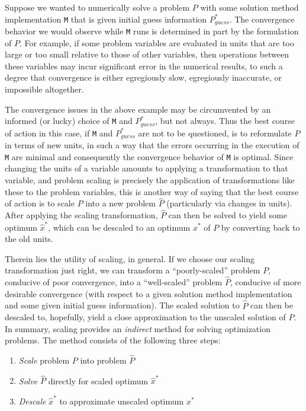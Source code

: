 \documentclass{article}
\begin{document}
\noindent
Suppose we wanted to numerically solve a problem $P$ with some solution method implementation \texttt{M} that is given initial guess information $P_{guess}^*$. The convergence behavior we would observe while \texttt{M} runs is determined in part by the formulation of $P$. For example, if some problem variables are evaluated in units that are too large or too small relative to those of other variables, then operations between these variables may incur significant error in the numerical results, to such a degree that convergence is either egregiously slow, egregiously inaccurate, or impossible altogether. 

The convergence issues in the above example may be circumvented by an informed (or lucky) choice of \texttt{M} and $P_{guess}^*$, but not always. Thus the best course of action in this case, if \texttt{M} and $P_{guess}^*$ are not to be questioned, is to reformulate $P$ in terms of new units, in such a way that the errors occurring in the execution of \texttt{M} are minimal and consequently the convergence behavior of \texttt{M} is optimal. Since changing the units of a variable amounts to applying a transformation to that variable, and problem scaling is precisely the application of transformations like these to the problem variables, this is another way of saying that the best course of action is to scale $P$ into a new problem $\hat{P}$ (particularly via changes in units). After applying the scaling transformation, $\hat{P}$ can then be solved to yield some optimum $\hat{x}^*$, which can be descaled to an optimum $x^*$ of $P$ by converting back to the old units.

Therein lies the utility of scaling, in general. If we choose our scaling transformation just right, we can transform a ``poorly-scaled'' problem $P$, conducive of poor convergence, into a ``well-scaled'' problem $\hat{P}$, conducive of more desirable convergence (with respect to a given solution method implementation and some given initial guess information). The scaled solution to $\hat{P}$ can then be descaled to, hopefully, yield a close approximation to the unscaled solution of $P$.
\\

\noindent
In summary, scaling provides an \textit{indirect} method for solving optimization problems. The method consists of the following three steps:
\begin{enumerate}
    \item \textit{Scale} problem $P$ into problem $\hat{P}$
    \item \textit{Solve} $\hat{P}$ directly for scaled optimum $\hat{x}^*$
    \item \textit{Descale} $\hat{x}^*$ to approximate unscaled optimum $x^*$
\end{enumerate}
\end{document}
